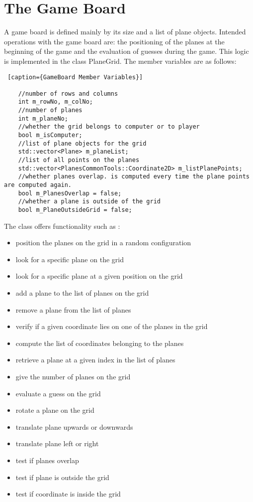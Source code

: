 \section{The Game Board} \label {Game_Board}

A game board is defined mainly by its size and a list of plane objects. Intended operations with the game board are: the positioning of the planes at the beginning of the game and the evaluation of guesses during the game. This logic is implemented in the class PlaneGrid. The member variables are as follows:

\begin{lstlisting} [caption={GameBoard Member Variables}]

	//number of rows and columns
	int m_rowNo, m_colNo;
	//number of planes
	int m_planeNo;
	//whether the grid belongs to computer or to player
	bool m_isComputer;
	//list of plane objects for the grid
	std::vector<Plane> m_planeList;
	//list of all points on the planes
	std::vector<PlanesCommonTools::Coordinate2D> m_listPlanePoints;
	//whether planes overlap. is computed every time the plane points are computed again.
	bool m_PlanesOverlap = false;
	//whether a plane is outside of the grid
	bool m_PlaneOutsideGrid = false;

\end{lstlisting}

The class offers functionality such as :
\begin{itemize}
	\item position the planes on the grid in a random configuration
	\item look for a specific plane on the grid
	\item look for a specific plane at a given position on the grid
	\item add a plane to the list of planes on the grid
	\item remove a plane from the list of planes
	\item verify if a given coordinate lies on one of the planes in the grid
	\item compute the list of coordinates belonging to the planes
	\item retrieve a plane at a given index in the list of planes
	\item give the number of planes on the grid
	\item evaluate a guess on the grid
	\item rotate a plane on the grid
	\item translate plane upwards or downwards
	\item translate plane left or right
	\item test if planes overlap
	\item test if plane is outside the grid
	\item test if coordinate is inside the grid

\end{itemize}